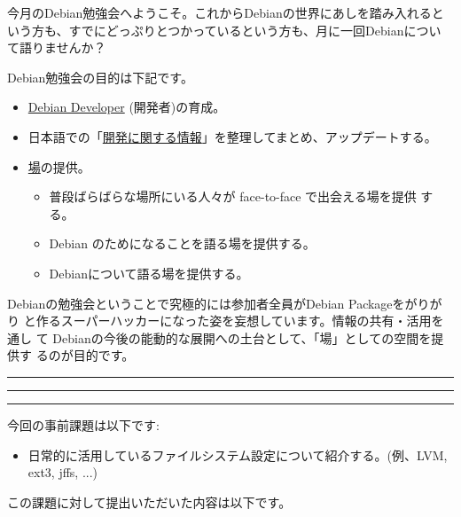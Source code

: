 \documentclass[mingoth,a4paper]{jsarticle}
\begin{document}
\begin{multicols}{2}
 

 今月のDebian勉強会へようこそ。これからDebianの世界にあしを踏み入れると
 いう方も、すでにどっぷりとつかっているという方も、月に一回Debianについ
 て語りませんか？

 Debian勉強会の目的は下記です。

 \begin{itemize}
 \item \underline{Debian Developer} (開発者)の育成。
 \item 日本語での「\underline{開発に関する情報}」を整理してまとめ、アップデートする。
 \item \underline{場}の提供。
 \begin{itemize}
  \item 普段ばらばらな場所にいる人々が face-to-face で出会える場を提供
	する。
  \item Debian のためになることを語る場を提供する。
  \item Debianについて語る場を提供する。
 \end{itemize}
 \end{itemize}		

 Debianの勉強会ということで究極的には参加者全員がDebian Packageをがりがり
 と作るスーパーハッカーになった姿を妄想しています。情報の共有・活用を通し
 て Debianの今後の能動的な展開への土台として、「場」としての空間を提供す
 るのが目的です。

\end{multicols}

\newpage

\begin{minipage}[b]{0.2\hsize}
 \colorbox{titleback}{}
\end{minipage}
\begin{minipage}[b]{0.8\hsize}
\hrule
\vspace{2mm}
\hrule
\begin{multicols}{2}
\tableofcontents
\end{multicols}
\vspace{2mm}
\hrule
\end{minipage}


今回の事前課題は以下です:
\begin{itemize}
 \item 日常的に活用しているファイルシステム設定について紹介する。(例、LVM, ext3, jffs, ...)
\end{itemize}
この課題に対して提出いただいた内容は以下です。
\begin{multicols}{2}
{\small
 
}
\end{multicols}
\end{document}
